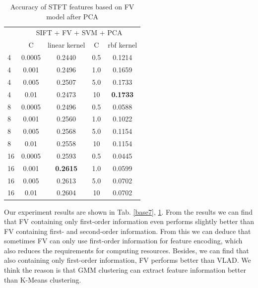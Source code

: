 \documentclass[conference]{IEEEtran}
\begin{document}
\begin{table}[htbp]
	\centering
	\newcommand{\tabincell}[2]{\begin{tabular}{@{}#1@{}}#2\end{tabular}}
	\renewcommand\arraystretch{1.0}
	\caption{Accuracy of STFT features based on FV model after PCA}
	\label{base8}%
	\begin{tabular}{@{}p{1cm}<{\centering}|c|c|c|c}
		\hline
		\multirow{2}{*}{\diagbox[height=2\line,width=1.42cm,font=\tiny]{$k$}{Acc.}{$\mathit{M}$}} &
		\multicolumn{4}{c}{SIFT + FV + SVM + PCA}\\
		\cline{2-5}
		& {C} & {linear kernel} & {C} & {rbf kernel}\\
		\hline
		4   & 0.0005  & 0.2440 & 0.5 & 0.1214\\
		4   & 0.001  & 0.2496 & 1.0 & 0.1659\\
		4   & 0.005  & 0.2507 & 5.0 & 0.1733\\
        4   & 0.01  & 0.2473 & 10 & \textbf{0.1733}\\
        \hline
		8   & 0.0005 & 0.2496 & 0.5 & 0.0588\\
		8   & 0.001 & 0.2560 & 1.0 & 0.1022\\
		8   & 0.005 & 0.2568 & 5.0 & 0.1154\\
        8   & 0.01  & 0.2558 & 10 & 0.1154\\
        \hline
		16   & 0.0005  & 0.2593 & 0.5 & 0.0445\\
		16   & 0.001  & \textbf{0.2615} & 1.0 & 0.0599\\
		16   & 0.005  & 0.2613 & 5.0 & 0.0702\\
		16   & 0.01  & 0.2604 & 10 & 0.0702\\
		\hline
	\end{tabular}
\end{table}

Our experiment results are shown in Tab. \ref{base7}, \ref{base8}. From the results we can find that FV containing only first-order information even performs slightly better than FV containing first- and second-order information. From this we can deduce that sometimes FV can only use first-order information for feature encoding, which also reduces the requirements for computing resources. Besides, we can find that also containing only first-order information, FV performs better than VLAD. We think the reason is that GMM clustering can extract feature information better than K-Means clustering.


\end{document}
